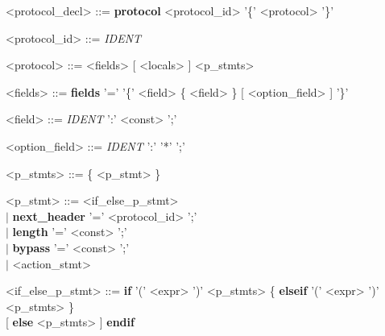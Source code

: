\documentclass{article}
\begin{document}
\begin{grammar} \small

{\renewcommand\baselinestretch{0}\selectfont
<protocol\_decl>   ::= \textbf{protocol} <protocol\_id>  '\{' <protocol> '\}'

<protocol\_id>     ::=   \emph{IDENT}

<protocol>   ::= <fields> [ <locals> ] <p\_stmts>

<fields>   ::= \textbf{fields} '='  '\{' <field> \{ <field> \} [ <option\_field> ] '\}'

<field>     ::=   \emph{IDENT} ':' <const> ';'

<option\_field>     ::=   \emph{IDENT} ':' '*' ';'

<p\_stmts>     ::=   \{ <p\_stmt>  \}

<p\_stmt>     ::=   <if\_else\_p\_stmt> \\
     \hspace*{0.95cm} $\mid$  \textbf{next\_header} '=' <protocol\_id> ';' \\
     \hspace*{0.95cm} $\mid$  \textbf{length} '=' <const> ';' \\
     \hspace*{0.95cm} $\mid$  \textbf{bypass} '=' <const> ';' \\
     \hspace*{0.95cm} $\mid$  <action\_stmt>

<if\_else\_p\_stmt>     ::=   \textbf{if} '(' <expr> ')' <p\_stmts> \{ \textbf{elseif} '(' <expr> ')' <p\_stmts> \}  \\
     \hspace*{2.35cm} [ \textbf{else} <p\_stmts> ] \textbf{endif}

\par}

\end{grammar}
\end{document}
